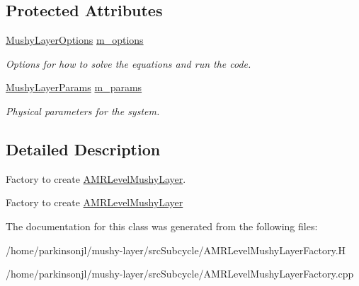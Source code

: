 \subsection*{Protected Attributes}
\begin{DoxyCompactItemize}
\item 
\mbox{\label{class_a_m_r_level_mushy_layer_factory_a6274c54a6fa011196d53350b25d92c23}} 
\hyperlink{struct_mushy_layer_options}{Mushy\+Layer\+Options} \hyperlink{class_a_m_r_level_mushy_layer_factory_a6274c54a6fa011196d53350b25d92c23}{m\+\_\+options}
\begin{DoxyCompactList}\small\item\em Options for how to solve the equations and run the code. \end{DoxyCompactList}\item 
\mbox{\label{class_a_m_r_level_mushy_layer_factory_aa672b2116eafcc2809c09abb976b18f1}} 
\hyperlink{class_mushy_layer_params}{Mushy\+Layer\+Params} \hyperlink{class_a_m_r_level_mushy_layer_factory_aa672b2116eafcc2809c09abb976b18f1}{m\+\_\+params}
\begin{DoxyCompactList}\small\item\em Physical parameters for the system. \end{DoxyCompactList}\end{DoxyCompactItemize}


\subsection{Detailed Description}
Factory to create \hyperlink{class_a_m_r_level_mushy_layer}{A\+M\+R\+Level\+Mushy\+Layer}. 

Factory to create \hyperlink{class_a_m_r_level_mushy_layer}{A\+M\+R\+Level\+Mushy\+Layer} 

The documentation for this class was generated from the following files\+:\begin{DoxyCompactItemize}
\item 
/home/parkinsonjl/mushy-\/layer/src\+Subcycle/A\+M\+R\+Level\+Mushy\+Layer\+Factory.\+H\item 
/home/parkinsonjl/mushy-\/layer/src\+Subcycle/A\+M\+R\+Level\+Mushy\+Layer\+Factory.\+cpp\end{DoxyCompactItemize}

